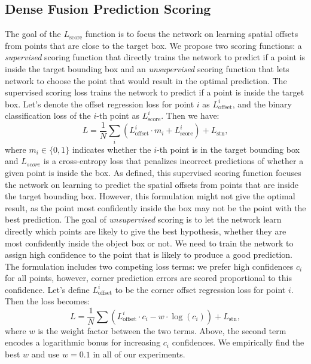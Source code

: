 \documentclass[10pt,twocolumn,letterpaper]{article}
\begin{document}
\subsection{Dense Fusion Prediction Scoring}
\label{sec:score}
The goal of the $L_{\mathrm{score}}$ function is to focus the network on learning spatial offsets from points that are close to the target box. We propose two scoring functions: a \textit{supervised} scoring function that directly trains the network to predict if a point is inside the target bounding box and an \textit{unsupervised} scoring function that lets network to choose the point that would result in the optimal prediction. 
 The supervised scoring loss trains the network to predict if a point is inside the target box. Let's denote the offset regression loss for point $i$ as $L^i_{\mathrm{offset}}$, and the binary classification loss of the $i$-th point as $L^i_{\mathrm{score}}$. Then we have:
\begin{equation}
    L = \frac{1}{N}\sum_i (L^i_{\mathrm{offset}} \cdot m_i + L^i_{\mathrm{score}}) + L_{\mathrm{stn}},
\end{equation}
where $m_i \in \{0, 1\}$ indicates whether the $i$-th point is in the target bounding box and $L_{score}$ is a cross-entropy loss that penalizes incorrect predictions of whether a given point is inside the box. As defined, this supervised scoring function focuses the network on learning to predict the spatial offsets from points that are inside the target bounding box. However, this formulation might not give the optimal result, as the point most confidently inside the box may not be the point with the best prediction. 
The goal of \textit{unsupervised} scoring is to let the network learn directly which points are likely to give the best hypothesis, whether they are most confidently inside the object box or not. We need to train the network to assign high confidence to the point that is likely to produce a good prediction. The formulation includes two competing loss terms: we prefer high confidences $c_i$ for all points, however, corner prediction errors are scored proportional to this confidence. Let's define $L^i_{\mathrm{offset}}$ to be the corner offset regression loss for point $i$. Then the loss becomes: 
\begin{equation}
    L = \frac{1}{N}\sum (L^i_{\mathrm{offset}}\cdot c_i - w \cdot \log(c_i)) + L_{\mathrm{stn}}, 
\end{equation}
where $w$ is the weight factor between the two terms. Above, the second term encodes a logarithmic bonus for increasing $c_i$ confidences. We empirically find the best $w$ and use $w=0.1$ in all of our experiments.
\end{document}
